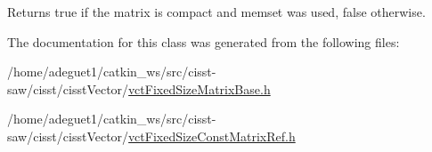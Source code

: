 \begin{DoxyReturn}{Returns}
true if the matrix is compact and memset was used, false otherwise. 
\end{DoxyReturn}


The documentation for this class was generated from the following files\-:\begin{DoxyCompactItemize}
\item 
/home/adeguet1/catkin\-\_\-ws/src/cisst-\/saw/cisst/cisst\-Vector/\hyperlink{vct_fixed_size_matrix_base_8h}{vct\-Fixed\-Size\-Matrix\-Base.\-h}\item 
/home/adeguet1/catkin\-\_\-ws/src/cisst-\/saw/cisst/cisst\-Vector/\hyperlink{vct_fixed_size_const_matrix_ref_8h}{vct\-Fixed\-Size\-Const\-Matrix\-Ref.\-h}\end{DoxyCompactItemize}
